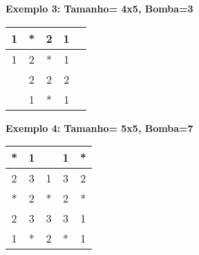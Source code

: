 \documentclass[a4paper]{exam}
\begin{document}
\textbf{Exemplo 3: Tamanho= 4x5, Bomba=3}
\begin{table}[H]
	\centering
	\begin{tabular}{|c|c|c|c|c|}
		\hline
		1 & * & 2 & 1 &  \\ \hline
		1 & 2 & * & 1 &  \\ \hline
		& 2 & 2 & 2 &  \\ \hline
		& 1 & * & 1 &  \\ \hline
	\end{tabular}
\end{table}

\textbf{Exemplo 4: Tamanho= 5x5, Bomba=7}
\begin{table}[H]
	\centering
	\begin{tabular}{|c|c|c|c|c|}
		\hline
		* & 1 &   & 1 & * \\ \hline
		2 & 3 & 1 & 3 & 2 \\ \hline
		* & 2 & * & 2 & * \\ \hline
		2 & 3 & 3 & 3 & 1 \\ \hline
		1 & * & 2 & * & 1 \\ \hline
	\end{tabular}
\end{table}

\end{document}
